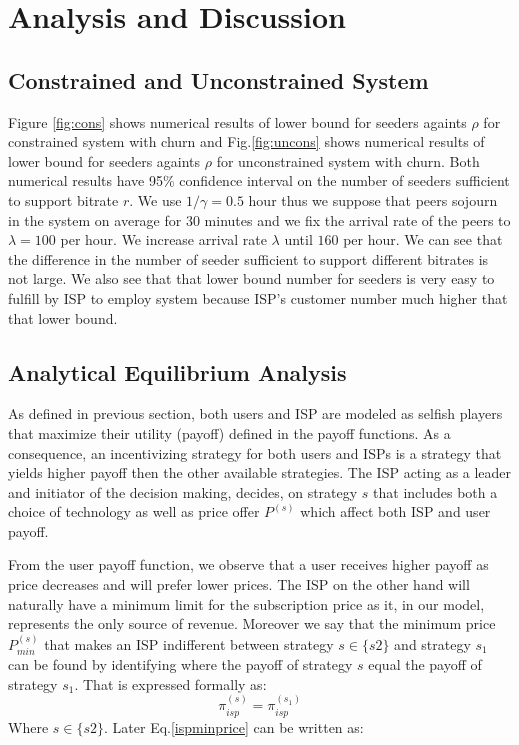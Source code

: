 \documentclass[paper]{ieice}
\begin{document}
\section{Analysis and Discussion}

\subsection{Constrained and Unconstrained System}

Figure \ref{fig:cons} shows numerical results of lower bound for seeders againts $\rho$ for constrained system with churn and Fig.\ref{fig:uncons} shows numerical results of lower bound for seeders againts $\rho$ for unconstrained system with churn.  
Both numerical results have 95\% confidence interval on the number of seeders sufficient to support bitrate $r$.  
We use $1/\gamma = 0.5$ hour thus we suppose that peers sojourn in the system on average for 30 minutes and we fix the arrival rate of the peers to $\lambda=100$ per hour.
We increase arrival rate $\lambda$ until $160$ per hour. 
We can see that the difference in the number of seeder sufficient to support different bitrates is not large.  
We also see that that lower bound number for seeders is very easy to fulfill by ISP to employ system because ISP's customer number much higher that that lower bound.

\subsection{Analytical Equilibrium Analysis}
As defined in previous section, both users and ISP are modeled as selfish players that maximize their utility (payoff) defined in the payoff functions.
As a consequence, an incentivizing strategy for both users and ISPs is a strategy that yields higher payoff then the other available strategies.
The ISP acting as a leader and initiator of the decision making, decides, on strategy $s$ that includes both a choice of technology as well as price offer $P^{(s)}$ which affect both ISP and user payoff.

From the user payoff function, we observe that a user receives higher payoff as price decreases and will prefer lower prices.
The ISP on the other hand will naturally have a minimum limit for the subscription price as it, in our model, represents the only source of revenue.
Moreover we say that the minimum price $P^{(s)}_{min}$ that makes an ISP indifferent between strategy $s \in \{s2\}$ and strategy $s_1$ can be found by identifying where the payoff of strategy $s$ equal the payoff of strategy $s_1$. 
That is expressed formally as:
\begin{equation}\label{ispminprice}
	\pi^{(s)}_{isp} = \pi^{(s_1)}_{isp}
\end{equation}
Where $s \in \{s2\}$. 
Later Eq.\ref{ispminprice} can be written as: 
\end{document}
